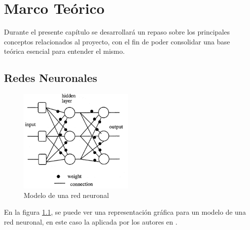   \chapter{Marco Teórico} 
\label{C:antecedentes}
Durante el presente capítulo se desarrollará un repaso sobre los principales conceptos relacionados al proyecto, con el fin de poder consolidar una base teórica esencial para entender el mismo.
\section{Redes Neuronales}
\begin{figure}[h!]
    \centering
    \includegraphics[width=0.5\textwidth]{imagenes/marco teorico/modelo_red.png}
    \caption{Modelo de una red neuronal \cite{nallasamy}}
    \label{neural_model}
\end{figure}
\par
En la figura \ref{neural_model}, se puede ver una representación gráfica para un modelo de una red neuronal, en este caso la aplicada por los autores en \cite{nallasamy}.
